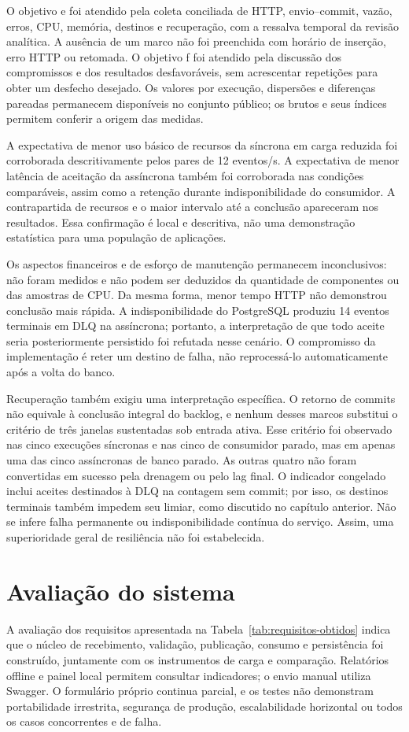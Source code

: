 O objetivo e foi atendido pela coleta conciliada de HTTP, envio--commit, vazão, erros, CPU, memória, destinos e recuperação, com a ressalva temporal da revisão analítica. A ausência de um marco não foi preenchida com horário de inserção, erro HTTP ou retomada. O objetivo f foi atendido pela discussão dos compromissos e dos resultados desfavoráveis, sem acrescentar repetições para obter um desfecho desejado. Os valores por execução, dispersões e diferenças pareadas permanecem disponíveis no conjunto público; os brutos e seus índices permitem conferir a origem das medidas.

A expectativa de menor uso básico de recursos da síncrona em carga reduzida foi corroborada descritivamente pelos pares de 12 eventos/s. A expectativa de menor latência de aceitação da assíncrona também foi corroborada nas condições comparáveis, assim como a retenção durante indisponibilidade do consumidor. A contrapartida de recursos e o maior intervalo até a conclusão apareceram nos resultados. Essa confirmação é local e descritiva, não uma demonstração estatística para uma população de aplicações.

Os aspectos financeiros e de esforço de manutenção permanecem inconclusivos: não foram medidos e não podem ser deduzidos da quantidade de componentes ou das amostras de CPU. Da mesma forma, menor tempo HTTP não demonstrou conclusão mais rápida. A indisponibilidade do PostgreSQL produziu 14 eventos terminais em DLQ na assíncrona; portanto, a interpretação de que todo aceite seria posteriormente persistido foi refutada nesse cenário. O compromisso da implementação é reter um destino de falha, não reprocessá-lo automaticamente após a volta do banco.

Recuperação também exigiu uma interpretação específica. O retorno de commits não equivale à conclusão integral do backlog, e nenhum desses marcos substitui o critério de três janelas sustentadas sob entrada ativa. Esse critério foi observado nas cinco execuções síncronas e nas cinco de consumidor parado, mas em apenas uma das cinco assíncronas de banco parado. As outras quatro não foram convertidas em sucesso pela drenagem ou pelo lag final. O indicador congelado inclui aceites destinados à DLQ na contagem sem commit; por isso, os destinos terminais também impedem seu limiar, como discutido no capítulo anterior. Não se infere falha permanente ou indisponibilidade contínua do serviço. Assim, uma superioridade geral de resiliência não foi estabelecida.

\section{Avaliação do sistema}
A avaliação dos requisitos apresentada na Tabela~\ref{tab:requisitos-obtidos} indica que o núcleo de recebimento, validação, publicação, consumo e persistência foi construído, juntamente com os instrumentos de carga e comparação. Relatórios offline e painel local permitem consultar indicadores; o envio manual utiliza Swagger. O formulário próprio continua parcial, e os testes não demonstram portabilidade irrestrita, segurança de produção, escalabilidade horizontal ou todos os casos concorrentes e de falha.

